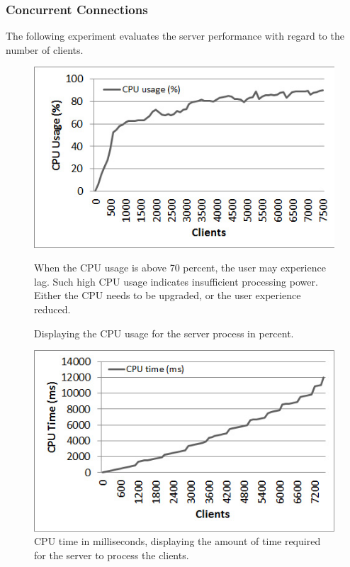 \documentclass[bsc,frontabs,twoside,singlespacing,parskip,deptreport]{infthesis}     %
\begin{document}
\subsubsection{Concurrent Connections}
The following experiment evaluates the server performance with regard to the number of clients.

\begin{center}
\begin{figure}[H]
\label{fig:cpu_usage}
\includegraphics[scale=0.75]{images/test_CLIENT_CPUusage.jpg}
\caption{Displaying the CPU usage for the server process in percent.}
\vspace{1em}
When the CPU usage is above 70 percent, the user may experience lag. Such high CPU usage indicates insufficient processing power. Either the CPU needs to be upgraded, or the user experience reduced.
\end{figure}

\begin{figure}
\label{fig:cpu_time}
\includegraphics[scale=0.75]{images/test_CLIENT_CPUtime.jpg}
\caption{CPU time in milliseconds, displaying the amount of time required for the server to process the clients.}
\end{figure}


\end{center}
\end{document}
